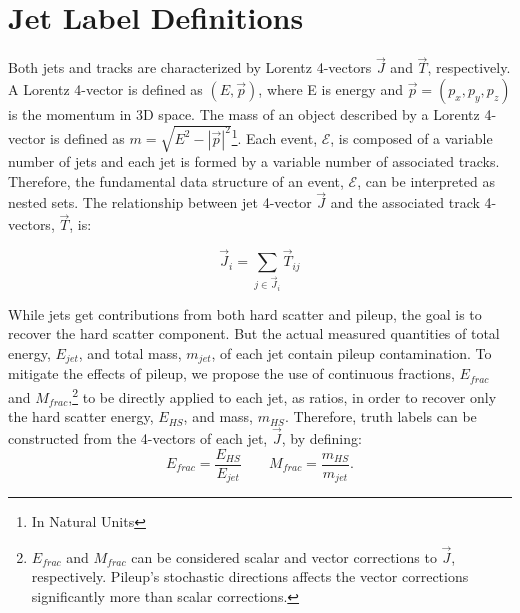 \section{Jet Label Definitions}\label{JetLabels}\hfill

Both jets and tracks are characterized by Lorentz 4-vectors $\overrightarrow{J}$ and $\overrightarrow{T}$, respectively. A Lorentz 4-vector is defined as $(E,\overrightarrow{p})$, where E is energy and $\overrightarrow{p}=(p_x,p_y,p_z)$ is the momentum in 3D space. The mass of an object described by a Lorentz 4-vector is defined as $m=\sqrt{E^2-|\overrightarrow{p}|^2}$\footnote{In Natural Units}. Each event, $\mathcal{E}$, is composed of a variable number of jets and each jet is formed by a variable number of associated tracks. Therefore, the fundamental data structure of an event, $\mathcal{E}$, can be interpreted as nested sets. The relationship between jet 4-vector $\overrightarrow{J}$ and the associated track 4-vectors, $\overrightarrow{T}$, is:

\begin{equation}
  \overrightarrow{J}_i = \sum\limits_{j \in \overrightarrow{J}_i} \overrightarrow{T}_{ij}
\end{equation}

While jets get contributions from both hard scatter and pileup, the goal is to recover the hard scatter component. But the actual measured quantities of total energy, $E_{jet}$, and total mass, $m_{jet}$, of each jet contain pileup contamination. To mitigate the effects of pileup, we propose the use of continuous fractions, $E_{frac}$ and $M_{frac}$,\footnote{$E_{frac}$ and $M_{frac}$ can be considered scalar and vector corrections to $\overrightarrow{J}$, respectively. Pileup's stochastic directions affects the vector corrections significantly more than scalar corrections.} to be directly applied to each jet, as ratios, in order to recover only the hard scatter energy, $E_{HS}$, and mass, $m_{HS}$. Therefore, truth labels can be constructed from the 4-vectors of each jet, $\overrightarrow{J}$, by defining:
\begin{equation}
  E_{frac}=\frac{E_{HS}}{E_{jet}} \phantom{.......} M_{frac}=\frac{m_{HS}}{m_{jet}}.
\end{equation}


